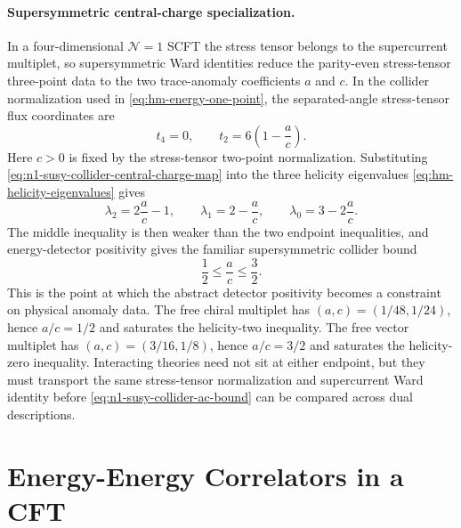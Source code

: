 \paragraph{Supersymmetric central-charge specialization.}
In a four-dimensional \(\mathcal N=1\) SCFT the stress tensor belongs to the
supercurrent multiplet, so supersymmetric Ward identities reduce the
parity-even stress-tensor three-point data to the two trace-anomaly
coefficients \(a\) and \(c\).  In the collider normalization used in
\eqref{eq:hm-energy-one-point}, the separated-angle stress-tensor flux
coordinates are
\begin{equation}
  t_4=0,\qquad
  t_2=6\left(1-\frac{a}{c}\right).
  \label{eq:n1-susy-collider-central-charge-map}
\end{equation}
Here \(c>0\) is fixed by the stress-tensor two-point normalization.  Substituting
\eqref{eq:n1-susy-collider-central-charge-map} into the three helicity
eigenvalues \eqref{eq:hm-helicity-eigenvalues} gives
\begin{equation}
  \lambda_2=2\frac{a}{c}-1,\qquad
  \lambda_1=2-\frac{a}{c},\qquad
  \lambda_0=3-2\frac{a}{c}.
  \label{eq:n1-susy-collider-helicity-eigenvalues}
\end{equation}
The middle inequality is then weaker than the two endpoint inequalities, and
energy-detector positivity gives the familiar supersymmetric collider bound
\begin{equation}
  \frac12\leq\frac{a}{c}\leq\frac32 .
  \label{eq:n1-susy-collider-ac-bound}
\end{equation}
This is the point at which the abstract detector positivity becomes a
constraint on physical anomaly data.  The free chiral multiplet has
\((a,c)=(1/48,1/24)\), hence \(a/c=1/2\) and saturates the helicity-two
inequality.  The free vector multiplet has
\((a,c)=(3/16,1/8)\), hence \(a/c=3/2\) and saturates the helicity-zero
inequality.  Interacting theories need not sit at either endpoint, but they
must transport the same stress-tensor normalization and supercurrent Ward
identity before \eqref{eq:n1-susy-collider-ac-bound} can be compared across
dual descriptions.

\section{Energy-Energy Correlators in a CFT}


